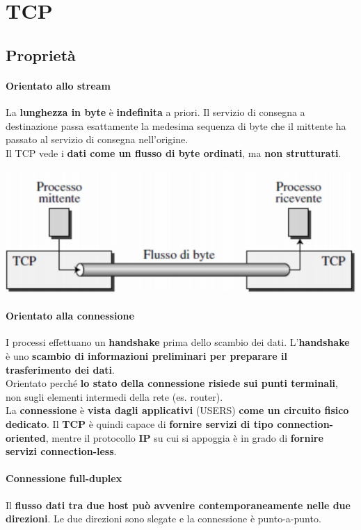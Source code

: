 \documentclass[10pt]{article}
\begin{document}
\section{TCP}
\subsection{Proprietà}
\paragraph{Orientato allo stream} La \textbf{lunghezza in byte} è \textbf{indefinita} a priori. Il servizio di consegna a destinazione passa esattamente la medesima sequenza di byte che il mittente ha passato al servizio di consegna nell'origine.\\
Il TCP vede i \textbf{dati come un flusso di byte ordinati}, ma \textbf{non strutturati}.\\
\begin{center}
\includegraphics[scale=0.75]{tcpstream.png}
\end{center}
\paragraph{Orientato alla connessione} I processi effettuano un \textbf{handshake} prima dello scambio dei dati. L'\textbf{handshake} è uno \textbf{scambio di informazioni preliminari per preparare il trasferimento dei dati}.\\
Orientato perché \textbf{lo stato della connessione risiede sui punti terminali}, non sugli elementi intermedi della rete (es. router).\\
La \textbf{connessione} è \textbf{vista dagli applicativi} (USERS) \textbf{come un circuito fisico dedicato}. Il \textbf{TCP} è quindi capace di \textbf{fornire servizi di tipo connection-oriented}, mentre il protocollo \textbf{IP} su cui si appoggia è in grado di \textbf{fornire servizi connection-less}.
\paragraph{Connessione full-duplex} Il \textbf{flusso dati tra due host può avvenire contemporaneamente nelle due direzioni}. Le due direzioni sono slegate e la connessione è punto-a-punto.
\end{document}
